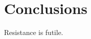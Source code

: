 \documentclass{article}
\begin{document}


%
%

\FloatBarrier
\section{Conclusions}

Resistance is futile.


%
% 

\FloatBarrier
\printbibliography[heading = bibnumbered]
\end{document}
